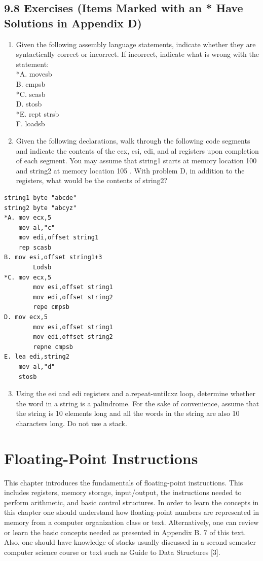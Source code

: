 \documentclass[10pt]{book}
\begin{document}
\begin{center}
\begin{center}
\begin{center}
\begin{center}
\subsection*{9.8 Exercises (Items Marked with an * Have Solutions in Appendix D)}
\begin{enumerate}
  \item Given the following assembly language statements, indicate whether they are syntactically correct or incorrect. If incorrect, indicate what is wrong with the statement:\\
*A. movesb\\
B. cmpsb\\
*C. scasb\\
D. stosb\\
*E. rept strsb\\
F. loadsb
  \item Given the following declarations, walk through the following code segments and indicate the contents of the ecx, esi, edi, and al registers upon completion of each segment. You may assume that string1 starts at memory location 100 and string2 at memory location 105 . With problem D, in addition to the registers, what would be the contents of string2?
\end{enumerate}

\begin{verbatim}
string1 byte "abcde"
string2 byte "abcyz"
*A. mov ecx,5
    mov al,"c"
    mov edi,offset string1
    rep scasb
B. mov esi,offset string1+3
        Lodsb
*C. mov ecx,5
        mov esi,offset string1
        mov edi,offset string2
        repe cmpsb
D. mov ecx,5
        mov esi,offset string1
        mov edi,offset string2
        repne cmpsb
E. lea edi,string2
    mov al,"d"
    stosb
\end{verbatim}

\begin{enumerate}
  \setcounter{enumi}{2}
  \item Using the esi and edi registers and a.repeat-untilcxz loop, determine whether the word in a string is a palindrome. For the sake of convenience, assume that the string is 10 elements long and all the words in the string are also 10 characters long. Do not use a stack.
\end{enumerate}


\section*{Floating-Point Instructions}
This chapter introduces the fundamentals of floating-point instructions. This includes registers, memory storage, input/output, the instructions needed to perform arithmetic, and basic control structures. In order to learn the concepts in this chapter one should understand how floating-point numbers are represented in memory from a computer organization class or text. Alternatively, one can review or learn the basic concepts needed as presented in Appendix B. 7 of this text. Also, one should have knowledge of stacks usually discussed in a second semester computer science course or text such as Guide to Data Structures [3].



\end{center}
\end{center}
\end{center}
\end{center}
\end{document}
